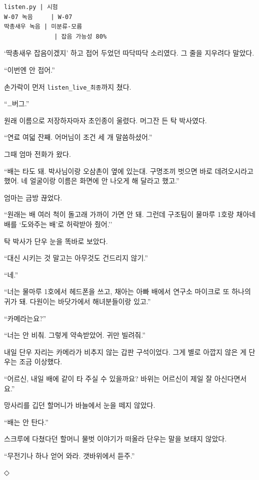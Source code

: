 \documentclass[
  korean,
  letterpaper,
  twoside,
  open=any,
  fontsize=12.5pt,
  headings=small]{scrbook}
\newcommand{\logfont}{\linespread{1}\fontsize{10.8}{15.2}\selectfont}
\begin{document}
\begin{Verbatim}[samepage=true,frame=single,framesep=2.5mm,rulecolor=\color{gray},formatcom=\logfont]
listen.py | 시험
W-07 녹음     | W-07
딱총새우 녹음 | 미분류-모름
              | 잡음 가능성 80%
\end{Verbatim}

`딱총새우 잡음이겠지' 하고
접어 두었던 따닥따닥 소리였다.
그 줄을 지우려다 말았다.

``이번엔 안 접어.''

손가락이 먼저
\texttt{listen\_live\_최종}까지
쳤다.

``\ldots 버그.''

원래 이름으로 저장하자마자
초인종이 울렸다. 머그잔 든 탁
박사였다.

``연료 여덟 잔째. 어머님이
조건 세 개 말씀하셨어.''

그때 엄마 전화가 왔다.

``배는 타도 돼. 박사님이랑
오삼촌이 옆에 있는대. 구명조끼
벗으면 바로 데려오시라고 했어.
네 얼굴이랑 이름은 화면에 안
나오게 해 달라고 했고.''

엄마는 금방 끊었다.

``원래는 배 여러 척이 돌고래
가까이 가면 안 돼. 그런데
구조팀이 물마루 1호랑 채아네
배를 `도와주는 배'로 허락받아
줬어.''

탁 박사가 단우 눈을 똑바로
보았다.

``대신 시키는 것 말고는
아무것도 건드리지 않기.''

``네.''

``너는 물마루 1호에서 헤드폰을
쓰고, 채아는 아빠 배에서
연구소 마이크로 또 하나의 귀가
돼. 다원이는 바닷가에서
해녀분들이랑 있고.''

``카메라는요?''

``너는 안 비춰. 그렇게
약속받았어. 귀만 빌려줘.''

내일 단우 자리는 카메라가
비추지 않는 갑판 구석이었다.
그게 별로 아깝지 않은 게
단우는 조금 이상했다.

``어르신, 내일 배에 같이 타
주실 수 있을까요? 바위는
어르신이 제일 잘
아신다면서요.''

망사리를 깁던 할머니가
바늘에서 눈을 떼지 않았다.

``배는 안 탄다.''

스크루에 다쳤다던 할머니 물벗
이야기가 떠올라 단우는 말을
보태지 않았다.

``무전기나 하나 얻어 와라.
갯바위에서 듣주.''

\begin{center}◇\end{center}\nopagebreak
\end{document}
